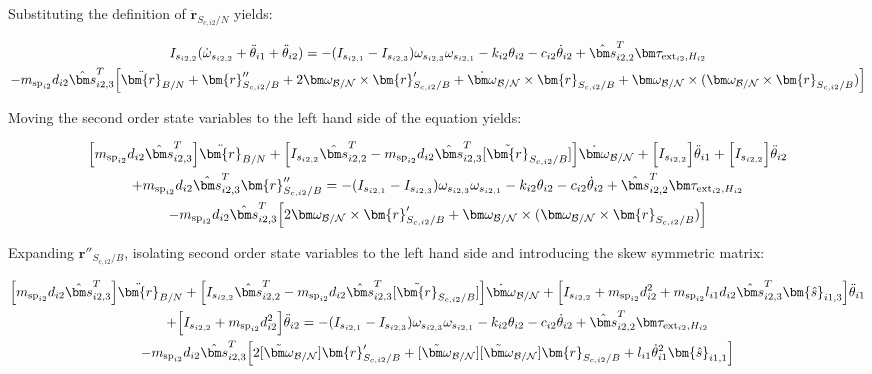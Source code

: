 \documentclass[paper]{aiaaNew}
\begin{document}
Substituting the definition of $\ddot{\bm r}_{S_{c,i2}/N}$ yields:

\begin{multline}
I_{s_{i2,2}} ( \dot\omega_{s_{i2,2}} + \ddot\theta_{i1} + \ddot\theta_{i2}) = - (I_{s_{i2,1}} - I_{s_{i2,3}}) \omega_{s_{i2,3}} \omega_{s_{i2,1}} - k_{i2} \theta_{i2} - c_{i2} \dot{\theta}_{i2} + \hat{\bm s}_{i2,2}^T \bm \tau_{\text{ext}_{i2},H_{i2}}  \\
-  m_{\text{sp}_{i2}} d_{i2} \hat{\bm s}_{i2,3}^T \Big[ \ddot{\bm{r}}_{B/N} + \bm{r}''_{S_{c,i2}/B} + 2 \bm\omega_{\cal B/N} \times \bm{r}'_{S_{c,i2}/B} +  \dot{\bm\omega}_{\cal B/N} \times \bm{r}_{S_{c,i2}/B} + \bm\omega_{\cal B/N} \times (\bm\omega_{\cal B/N} \times \bm{r}_{S_{c,i2}/B})\Big]
\end{multline}

Moving the second order state variables to the left hand side of the equation yields:

\begin{multline}
\Big[m_{\text{sp}_{i2}} d_{i2} \hat{\bm s}_{i2,3}^T\Big] \ddot{\bm{r}}_{B/N} + \Big[I_{s_{i2,2}} \hat{\bm s}_{i2,2}^T - m_{\text{sp}_{i2}} d_{i2} \hat{\bm s}_{i2,3}^T [\tilde{\bm{r}}_{S_{c,i2}/B}]\Big] \dot{\bm\omega}_{\cal B/N} + \Big[I_{s_{i2,2}}\Big] \ddot\theta_{i1} + \Big[I_{s_{i2,2}}\Big] \ddot\theta_{i2} \\
+ m_{\text{sp}_{i2}} d_{i2} \hat{\bm s}_{i2,3}^T  \bm{r}''_{S_{c,i2}/B} = - (I_{s_{i2,1}} - I_{s_{i2,3}}) \omega_{s_{i2,3}} \omega_{s_{i2,1}} - k_{i2} \theta_{i2} - c_{i2} \dot{\theta}_{i2} + \hat{\bm s}_{i2,2}^T \bm \tau_{\text{ext}_{i2},H_{i2}}  \\
-  m_{\text{sp}_{i2}} d_{i2} \hat{\bm s}_{i2,3}^T \Big[ 2 \bm\omega_{\cal B/N} \times \bm{r}'_{S_{c,i2}/B} + \bm\omega_{\cal B/N} \times (\bm\omega_{\cal B/N} \times \bm{r}_{S_{c,i2}/B})\Big]
\end{multline}

Expanding $\bm{r}''_{S_{c,i2}/B}$, isolating second order state variables to the left hand side and introducing the skew symmetric matrix:

\begin{multline}
\Big[m_{\text{sp}_{i2}} d_{i2} \hat{\bm s}_{i2,3}^T\Big] \ddot{\bm{r}}_{B/N} + \Big[I_{s_{i2,2}} \hat{\bm s}_{i2,2}^T - m_{\text{sp}_{i2}} d_{i2} \hat{\bm s}_{i2,3}^T [\tilde{\bm{r}}_{S_{c,i2}/B}]\Big] \dot{\bm\omega}_{\cal B/N} + \Big[I_{s_{i2,2}} + m_{\text{sp}_{i2}} d_{i2}^2 + m_{\text{sp}_{i2}} l_{i1} d_{i2} \hat{\bm s}_{i2,3}^T \bm{\hat{s}}_{i1,3} \Big] \ddot\theta_{i1} \\
+ \Big[I_{s_{i2,2}} + m_{\text{sp}_{i2}} d_{i2}^2 \Big] \ddot\theta_{i2} 
= - (I_{s_{i2,1}} - I_{s_{i2,3}}) \omega_{s_{i2,3}} \omega_{s_{i2,1}} - k_{i2} \theta_{i2} - c_{i2} \dot{\theta}_{i2} + \hat{\bm s}_{i2,2}^T \bm \tau_{\text{ext}_{i2},H_{i2}}  \\
-  m_{\text{sp}_{i2}} d_{i2} \hat{\bm s}_{i2,3}^T \Big[ 2 [\tilde{\bm\omega}_{\cal B/N}] \bm{r}'_{S_{c,i2}/B} + [\tilde{\bm\omega}_{\cal B/N}] [\tilde{\bm\omega}_{\cal B/N}] \bm{r}_{S_{c,i2}/B} + l_{i1} \dot{\theta}_{i1}^2 \bm{\hat{s}}_{i1,1} \Big]
\label{eq:sp2final}
\end{multline}
\end{document}
